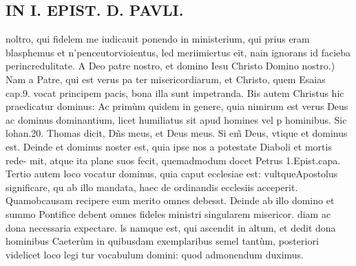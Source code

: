\documentclass{article}
\begin{document}
\begin{pages}
\section*{IN I. EPIST. D. PAVLI. }
\marginpar{[ p.6 ]}\pstart  noltro, qui fidelem me iudicauit ponendo in ministerium, qui prius eram blasphemus et n'penceutorvioientus, led meriimiertus eit, nain ignorans id facieba perincredulitate.  \pend\pstart A Deo patre nostro, et domino Iesu Christo Domino nostro.) Nam a Patre, qui est verus pa ter misericordiarum, et Christo, quem Esaias cap.9. vocat principem pacis, bona illa sunt impetranda. Bis autem Christus hic praedicatur dominus: Ac primùm quidem in genere, quia nimirum est verus Deus ac dominus dominantium, licet humiliatus sit apud homines vel p hominibus. Sic lohan.20. Thomas dicit, Dñs meus, et Deus meus. Si em̃ Deus, vtique  et dominus est. Deinde et dominus noster est, quia ipse nos a potestate Diaboli et mortis rede- mit, atque  ita plane suos fecit, quemadmodum docet Petrus 1.Epist.capa. Tertio autem loco vocatur dominus, quia caput ecclesiae est: vultqueApostolus significare, qu ab illo mandata, haec de ordinandis ecclesiis acceperit. Quamobcausam recipere eum merito omnes debesst. Deinde ab illo domino et summo Pontifice debent omnes fideles ministri singularem misericor. diam ac dona necessaria expectare. ls namque  est, qui ascendit in altum, et dedit dona hominibus  Caeterùm in quibusdam exemplaribus semel tantùm, posteriori videlicet loco legi tur vocabulum domini: quod admonendum duximus.  \pend
{}
{}

\end{pages}
\end{document}
